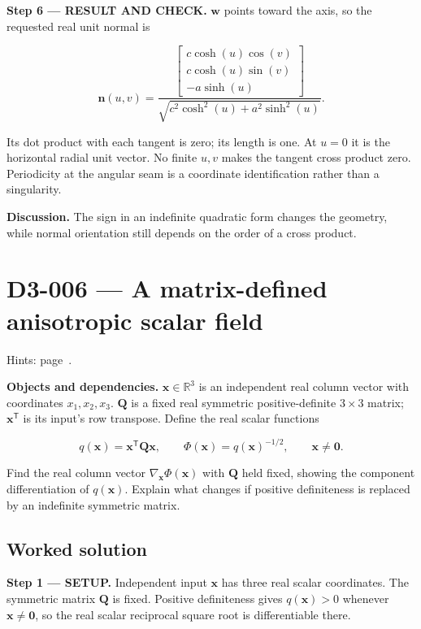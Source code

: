 \documentclass[11pt,oneside,openany]{book}
\begin{document}
\endgroup
\textbf{Step 6 --- RESULT AND CHECK.} \(\mathbf w\) points toward the axis, so the requested real unit normal is

\[
\mathbf n(u,v)=\frac{\begin{bmatrix}c\cosh(u)\cos(v)\\c\cosh(u)\sin(v)\\-a\sinh(u)\end{bmatrix}}
{\sqrt{c^2\cosh^2(u)+a^2\sinh^2(u)}}.
\]

Its dot product with each tangent is zero; its length is one. At \(u=0\) it is the horizontal radial unit vector. No finite \(u,v\) makes the tangent cross product zero. Periodicity at the angular seam is a coordinate identification rather than a singularity.

\textbf{Discussion.} The sign in an indefinite quadratic form changes the geometry, while normal orientation still depends on the order of a cross product.
\clearpage
\section{D3-006 --- A matrix-defined anisotropic scalar field}
\label{problem:D3-006}
{\small Hints: page~\pageref{hints:D3-006}.}\par\medskip

\textbf{Objects and dependencies.} \(\mathbf x\in\mathbb R^3\) is an independent real column vector with coordinates \(x_1,x_2,x_3\). \(\mathbf Q\) is a fixed real symmetric positive-definite \(3\times3\) matrix; \(\mathbf x^{\mathsf T}\) is its input's row transpose. Define the real scalar functions

\[
q(\mathbf x)=\mathbf x^{\mathsf T}\mathbf Q\mathbf x,\qquad
\Phi(\mathbf x)=q(\mathbf x)^{-1/2},\qquad \mathbf x\ne\mathbf0.
\]

Find the real column vector \(\nabla_{\mathbf x}\Phi(\mathbf x)\) with \(\mathbf Q\) held fixed, showing the component differentiation of \(q(\mathbf x)\). Explain what changes if positive definiteness is replaced by an indefinite symmetric matrix.
\subsection*{Worked solution}

\textbf{Step 1 --- SETUP.} Independent input \(\mathbf x\) has three real scalar coordinates. The symmetric matrix \(\mathbf Q\) is fixed. Positive definiteness gives \(q(\mathbf x)>0\) whenever \(\mathbf x\ne\mathbf0\), so the real scalar reciprocal square root is differentiable there.
\end{document}
